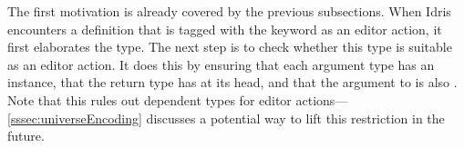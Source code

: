 The first motivation is already covered by the previous subsections.
When Idris encounters a definition that is tagged with the 
keyword as an editor action, it first elaborates the type.
The next step is to check whether this type is suitable as an editor action.
It does this by ensuring that each argument type has an \Editorable{} instance,
that the return type has \Elab{} at its head, and that the argument to \Elab{}
is also \Editorable{}.
Note that this rules out dependent types for editor
actions---\autoref{sssec:universeEncoding} discusses a potential way to lift
this restriction in the future.

